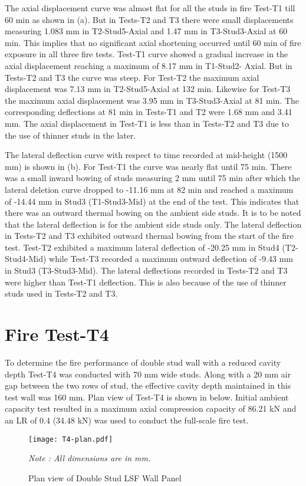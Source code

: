 The axial displacement curve was almost flat for all the studs in fire Test-T1 till 60 min as shown in  (a). But in Tests-T2 and T3 there were small displacements measuring 1.083 mm in T2-Stud5-Axial and 1.47 mm in T3-Stud3-Axial at 60 min. This implies that no significant axial shortening occurred until 60 min of fire exposure in all three fire tests. Test-T1 curve showed a gradual increase in the axial displacement reaching a maximum of 8.17 mm in T1-Stud2- Axial. But in Tests-T2 and T3 the curve was steep. For Test-T2 the maximum axial displacement was 7.13 mm in T2-Stud5-Axial at 132 min. Likewise for Test-T3 the maximum axial displacement was 3.95 mm in T3-Stud3-Axial at 81 min. The corresponding deflections at 81 min in Tests-T1 and T2 were 1.68 mm and 3.41 mm. The axial displacement in Test-T1 is less than in Tests-T2 and T3 due to the use of thinner studs in the later.

The lateral deflection curve with respect to time recorded at mid-height (1500 mm) is shown in  (b). For Test-T1 the curve was nearly flat until 75 min. There was a small inward bowing of studs measuring 2 mm until 75 min after which the lateral deletion curve dropped to -11.16 mm at 82 min and reached a maximum of -14.44 mm in Stud3 (T1-Stud3-Mid) at the end of the test. This indicates that there was an outward thermal bowing on the ambient side studs. It is to be noted that the lateral deflection is for the ambient side studs only. The lateral deflection in Tests-T2 and T3 exhibited outward thermal bowing from the start of the fire test. Test-T2 exhibited a maximum lateral deflection of -20.25 mm in Stud4 (T2-Stud4-Mid) while Test-T3 recorded a maximum outward deflection of -9.43 mm in Stud3 (T3-Stud3-Mid). The lateral deflections recorded in Tests-T2 and T3 were higher than Test-T1 deflection. This is also because of the use of thinner studs used in Tests-T2 and T3.

\section{Fire Test-T4}

To determine the fire performance of double stud wall with a reduced cavity depth Test-T4 was conducted with 70 mm wide studs. Along with a 20 mm air gap between the two rows of stud, the effective cavity depth maintained in this test wall was 160 mm. Plan view of Test-T4 is shown in  below. Initial ambient capacity test resulted in a maximum axial compression capacity of 86.21 kN and an LR of 0.4 (34.48 kN) was used to conduct the full-scale fire test.      
\begin{figure}[!htbp]
	\centering
	\texttt{[image: T4-plan.pdf]}
	\caption{Plan view of Double Stud LSF Wall Panel}
	\label{fig:T4-plan}
	\fontsize{10}{1}\textit{Note : All dimensions are in mm.}
\end{figure}

